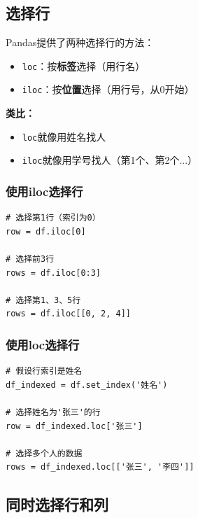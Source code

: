 \documentclass[12pt,a4paper]{article}
\begin{document}
\subsection{选择行}

Pandas提供了两种选择行的方法：

\begin{knowledgebox}
\begin{itemize}
    \item \texttt{loc}：按\textbf{标签}选择（用行名）
    \item \texttt{iloc}：按\textbf{位置}选择（用行号，从0开始）
\end{itemize}

\textbf{类比：}
\begin{itemize}
    \item \texttt{loc}就像用姓名找人
    \item \texttt{iloc}就像用学号找人（第1个、第2个...）
\end{itemize}
\end{knowledgebox}

\subsubsection{使用iloc选择行}

\begin{lstlisting}[caption={使用iloc选择行}]
# 选择第1行（索引为0）
row = df.iloc[0]

# 选择前3行
rows = df.iloc[0:3]

# 选择第1、3、5行
rows = df.iloc[[0, 2, 4]]
\end{lstlisting}

\subsubsection{使用loc选择行}

\begin{lstlisting}[caption={使用loc选择行}]
# 假设行索引是姓名
df_indexed = df.set_index('姓名')

# 选择姓名为'张三'的行
row = df_indexed.loc['张三']

# 选择多个人的数据
rows = df_indexed.loc[['张三', '李四']]
\end{lstlisting}

\subsection{同时选择行和列}
\end{document}
